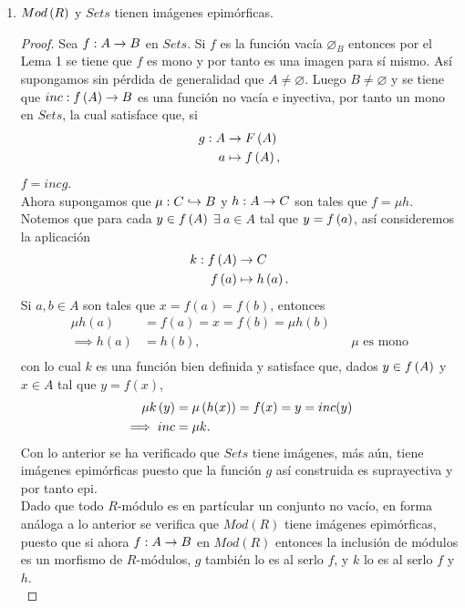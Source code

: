 \documentclass{article}
\begin{document}
\begin{enumerate}[label=\textbf{Ej \arabic*.}]
		\begin{proof}
			Se tiene que $f$ es un subobjeto y que $f=f1_A$. Si $\catarrow{g}{C}{B}{m}$ es un subobjeto para el cual $\exists\ \catarrow{h}{A}{C}{}$ tal que $f=gh$, entonces $f\leq g$ y por tanto $Im(f)\simeq f$ en $\moncategory{Sets}{B}$.
		\end{proof}
		\item $Mod\left(R\right)$ y $Sets$ tienen imágenes epimórficas.
		\begin{proof}
			Sea $\catarrow{f}{A}{B}{}$ en $Sets$. Si $f$ es la función vacía $\varnothing_B$ entonces por el Lema 1 se tiene que $f$ es mono y por tanto es una imagen para sí mismo. Así supongamos sin pérdida de generalidad que $A\neq\varnothing$. Luego $B\neq\varnothing$ y se tiene que $\catarrow{inc}{f\lrprth{A}}{B}{}$ es una función no vacía e inyectiva, por tanto un mono en $Sets$, la cual satisface que, si 
			\begin{align*}
				g: A &\rightarrow F\left(A\right)\\ a &\mapsto f\left(A\right),
			\end{align*}
			$f=inc g$.\\
			Ahora supongamos que $\catarrow{\mu}{C}{B}{m}$ y $\catarrow{h}{A}{C}{}$ son tales que $f=\mu h$. Notemos que para cada $y\in f\left(A\right)$ $\exists\ a\in A$ tal que $y=f\left(a\right)$, así consideremos la aplicación
			\begin{align*}
				k: f\left(A\right) &\rightarrow C\\ f\left(a\right) &\mapsto h\left(a\right).
			\end{align*}
			Si $a,b\in A$ son tales que $x=f(a)=f(b)$, entonces
			\begin{align*}
				\mu h(a)&=f(a)=x=f(b)=\mu h(b)\\
				\implies h(a)&=h(b), && \mu \text{ es mono}\\
			\end{align*}
			con lo cual $k$ es una función bien definida y satisface que, dados $y\in f\left(A\right)$ y $x\in A$ tal que $y=f(x)$,
			\begin{align*}
				\mu k\left(y\right)&=\mu\left(h(x)\right)=f(x)=y=inc(y)\\
				\implies inc&=\mu k.
			\end{align*}
			Con lo anterior se ha verificado que $Sets$ tiene imágenes, más aún, tiene  imágenes epimórficas puesto que la función $g$ así construida es suprayectiva y por tanto epi.\\
			Dado que todo $R$-módulo es en partícular un conjunto no vacío, en forma análoga a lo anterior se verifica que $Mod(R)$ tiene imágenes epimórficas, puesto que si ahora $\catarrow{f}{A}{B}{}$ en $Mod(R)$ entonces la inclusión de módulos es un morfismo de $R$-módulos, $g$ también lo es al serlo $f$, y $k$ lo es al serlo $f$ y $h$.\\

\end{proof}
\end{enumerate}
\end{document}
